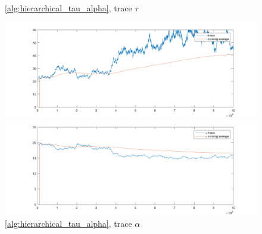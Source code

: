 \documentclass{siamart1116}
\begin{document}
    \begin{figure}[!htb]
        \begin{minipage}{0.48\textwidth}
            \centering
            \caption{\label{fig:moon_centered_tau} \cref{alg:hierarchical_tau_alpha}, trace $\tau$}
            \includegraphics[width=\linewidth]{graphics/moons/centered/trace_tau.png}
        \end{minipage} \hfill
        \begin{minipage}{0.48\textwidth}
            \centering
            \caption{\label{fig:moon_centered_alpha} \cref{alg:hierarchical_tau_alpha}, trace $\alpha$}
            \includegraphics[width=\linewidth]{graphics/moons/centered/trace_alpha.png}
        \end{minipage}
    \end{figure}
\end{document}
